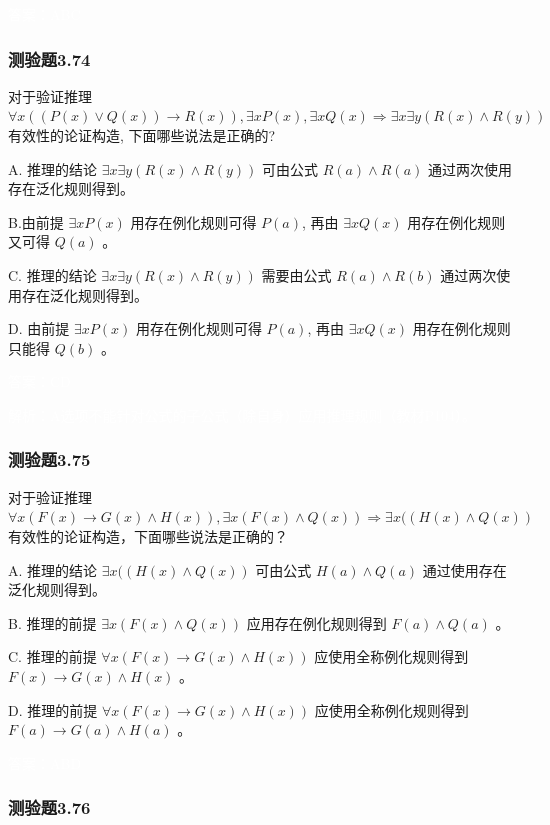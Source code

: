 \documentclass[UTF8, heading=true]{ctexart}
\begin{document}
\textcolor{white}{答案：ABC}



\subsubsection{测验题3.74}

对于验证推理 $\forall x((P(x) \vee Q(x)) \rightarrow R(x)), \exists x P(x), \exists x Q(x) \Longrightarrow \exists x \exists y(R(x) \wedge R(y))$ 有效性的论证构造, 下面哪些说法是正确的?

A. 推理的结论 $\exists x \exists y(R(x) \wedge R(y))$ 可由公式 $R(a) \wedge R(a)$ 通过两次使用存在泛化规则得到。

B.由前提 $\exists x P(x)$ 用存在例化规则可得 $P(a)$, 再由 $\exists x Q(x)$ 用存在例化规则又可得 $Q(a)$ 。

C. 推理的结论 $\exists x \exists y(R(x) \wedge R(y))$ 需要由公式 $R(a) \wedge R(b)$ 通过两次使用存在泛化规则得到。

D. 由前提 $\exists x P(x)$ 用存在例化规则可得 $P(a)$, 再由 $\exists x Q(x)$ 用存在例化规则只能得 $Q(b)$ 。

\textcolor{white}{答案：CD}

\textcolor{white}{解析：A选项不能针对公式的子公式（除自身）应用推理规则（教材P104）。}

\subsubsection{测验题3.75}

对于验证推理 $\forall x(F(x) \rightarrow G(x) \wedge H(x)), \exists x(F(x) \wedge Q(x)) \Longrightarrow \exists x((H(x) \wedge Q(x))$ 有效性的论证构造，下面哪些说法是正确的？

A.
推理的结论 $\exists x((H(x) \wedge Q(x))$ 可由公式 $H(a) \wedge Q(a)$ 通过使用存在泛化规则得到。

B.
推理的前提 $\exists x(F(x) \wedge Q(x))$ 应用存在例化规则得到 $F(a) \wedge Q(a)$ 。

C.
推理的前提 $\forall x(F(x) \rightarrow G(x) \wedge H(x))$ 应使用全称例化规则得到 $F(x) \rightarrow G(x) \wedge H(x)$ 。

D.
推理的前提 $\forall x(F(x) \rightarrow G(x) \wedge H(x))$ 应使用全称例化规则得到 $F(a) \rightarrow G(a) \wedge H(a)$ 。

\textcolor{white}{答案：ABD}

\subsubsection{测验题3.76}
\end{document}
